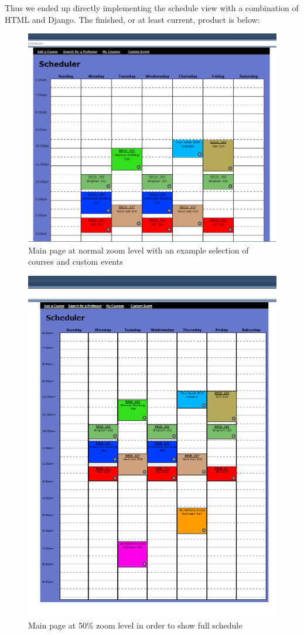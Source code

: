 \documentclass[pdftex,12pt,letter]{article}
\begin{document}
Thus we ended up directly implementing the schedule view with a combination of HTML and Django. The finished, or at least current, product is below:\newpage\FloatBarrier
\begin{figure}
\includegraphics[width=6in]{schedule1.png}
\caption{Main page at normal zoom level with an example selection of courses and custom events}
\end{figure}
\begin{figure}
\includegraphics[width=6in]{schedule2.png}
\caption{Main page at 50\% zoom level in order to show full schedule}
\end{figure}
\end{document}
